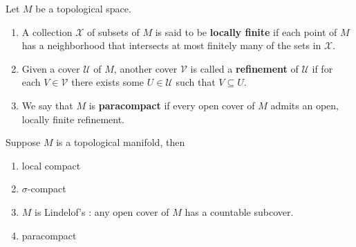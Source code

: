 \documentclass[12pt, oneside]{book}
\begin{document}
\begin{definition}
    Let $M$ be a topological space.
    \begin{enumerate}
        \item
              A collection $\mathcal{X}$ of subsets of $M$ is said to be \textbf{locally finite} if each point of $M$ has a neighborhood that intersects at most finitely many of the sets in $\mathcal{X}$.

        \item
              Given a cover $\mathcal{U}$ of $M$, another cover $\mathcal{V}$ is called a \textbf{refinement} of $\mathcal{U}$ if for each $V \in \mathcal{V}$ there exists some $U \in \mathcal{U}$ such that $V \subseteq U$.

        \item
              We say that $M$ is \textbf{paracompact} if every open cover of $M$ admits an open, locally finite refinement.
    \end{enumerate}
\end{definition}

\begin{proposition}
    Suppose $M$ is a topological manifold, then
    \begin{enumerate}
        \item
              local compact

        \item
              $\sigma$-compact

        \item
              $M$ is Lindelof's : any open cover of $M$ has a countable subcover.
        \item
              paracompact
    \end{enumerate}
\end{proposition}
\end{document}
